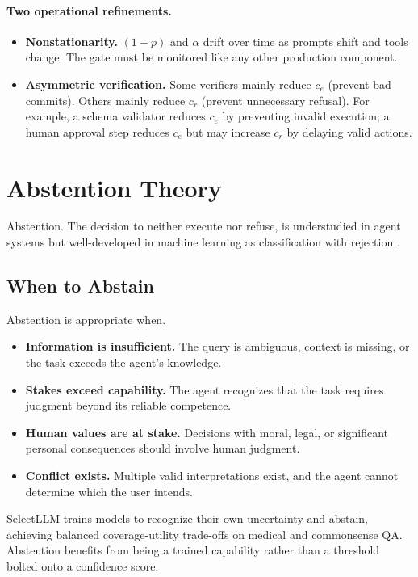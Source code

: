 \paragraph{Two operational refinements.}
\begin{itemize}
\item \textbf{Nonstationarity.} $(1-p)$ and $\alpha$ drift over time as prompts shift and tools change. The gate must be monitored like any other production component.
\item \textbf{Asymmetric verification.} Some verifiers mainly reduce $c_e$ (prevent bad commits). Others mainly reduce $c_r$ (prevent unnecessary refusal). For example, a schema validator reduces $c_e$ by preventing invalid execution; a human approval step reduces $c_e$ but may increase $c_r$ by delaying valid actions.
\end{itemize}

\section{Abstention Theory}

Abstention. The decision to neither execute nor refuse, is understudied in agent systems but well-developed in machine learning as classification with rejection \cite{hendrickx2024survey, wen2024abstention}.

\subsection{When to Abstain}

Abstention is appropriate when.
\begin{itemize}
\item \textbf{Information is insufficient.} The query is ambiguous, context is missing, or the task exceeds the agent's knowledge.
\item \textbf{Stakes exceed capability.} The agent recognizes that the task requires judgment beyond its reliable competence.
\item \textbf{Human values are at stake.} Decisions with moral, legal, or significant personal consequences should involve human judgment.
\item \textbf{Conflict exists.} Multiple valid interpretations exist, and the agent cannot determine which the user intends.
\end{itemize}

SelectLLM \cite{yoshikawa2025selectllm} trains models to recognize their own
uncertainty and abstain, achieving balanced coverage-utility trade-offs on medical
and commonsense QA. Abstention benefits from being a trained capability rather than
a threshold bolted onto a confidence score.

